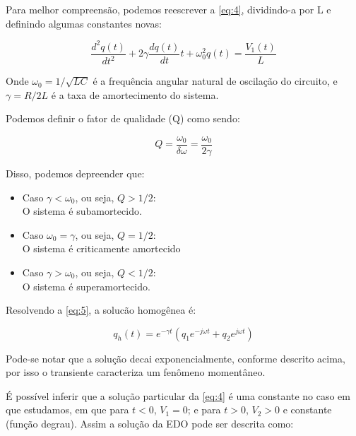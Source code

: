 \documentclass[11pt,a4paper]{article}
\begin{document}
    Para melhor compreensão, podemos reescrever a \cref{eq:4}, dividindo-a por L e definindo algumas constantes novas:
    
    \begin{equation}
        \dfrac {d^{2}q\left( t\right) }{dt^{2}}+2\gamma \dfrac {dq\left( t\right) }{dt}t+\omega ^{2}_{0}q\left( t\right) =\dfrac {V_{1}\left( t\right) }{L}
    \label{eq:5}
    \end{equation}
    
    Onde $\omega _0=1/\sqrt{LC}$ é a frequência angular natural de oscilação do circuito, e $\gamma=R/2L$ é a taxa de amortecimento do sistema.
    
    Podemos definir o fator de qualidade (Q) como sendo:
    
    \begin{equation}
        Q=\dfrac {\omega _0}{\delta \omega} = \dfrac{\omega _0}{ 2 \gamma}
    \label{eq:6}
    \end{equation}
    
    Disso, podemos depreender que:
    \begin{itemize}
        \item Caso $\gamma< \omega _0$, ou seja, $Q>1/2$:\\
        O sistema é subamortecido.
        \item Caso $\omega _0 = \gamma$, ou seja, $Q=1/2$:\\
        O sistema é criticamente amortecido
        \item Caso $\gamma> \omega _0$, ou seja, $Q<1/2$:\\
        O sistema é superamortecido.
    \end{itemize}
    
    Resolvendo a \cref{eq:5}, a solucão homogênea é:
    
    \begin{equation}
        q_h\left(t\right)=e^{-\gamma t}\left(q_1 e^{-j\omega t}+q_2 e^{j\omega t}\right)
    \label{eq:7}
    \end{equation}
    
    Pode-se notar que a solução decai exponencialmente, conforme descrito acima, por isso o transiente caracteriza um fenômeno momentâneo.
    
    É possível inferir que a solução particular da \cref{eq:4} é uma constante no caso em que estudamos, em que para $t<0$, $V_1 =0$; e para $t>0$, $V_2>0$ e constante (função degrau). Assim a solução da EDO pode ser descrita como:
    
\end{document}
